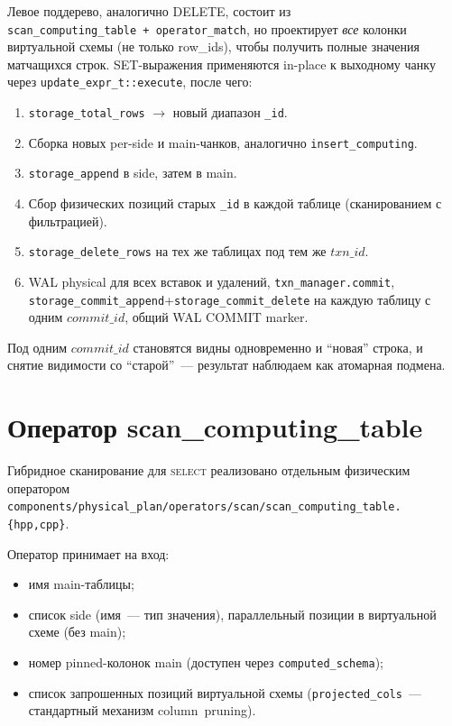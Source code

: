 Левое поддерево, аналогично DELETE, состоит из
\texttt{scan\_computing\_table~+~operator\_match}, но проектирует
\emph{все} колонки виртуальной схемы (не только row\_ids), чтобы
получить полные значения матчащихся строк. SET-выражения
применяются in-place к выходному чанку через
\texttt{update\_expr\_t::execute}, после чего:

\begin{enumerate}
    \item \texttt{storage\_total\_rows} $\to$ новый диапазон
    \texttt{\_id}.
    \item Сборка новых per-side и main-чанков, аналогично
    \texttt{insert\_computing}.
    \item \texttt{storage\_append} в side, затем в main.
    \item Сбор физических позиций старых \texttt{\_id} в каждой
    таблице (сканированием с фильтрацией).
    \item \texttt{storage\_delete\_rows} на тех же таблицах под
    тем же $\mathit{txn\_id}$.
    \item WAL physical для всех вставок и удалений,
    \texttt{txn\_manager.commit},
    \texttt{storage\_commit\_append}+\texttt{storage\_commit\_delete}
    на каждую таблицу с одним $\mathit{commit\_id}$, общий WAL
    COMMIT marker.
\end{enumerate}

Под одним $\mathit{commit\_id}$ становятся видны одновременно и
``новая'' строка, и снятие видимости со ``старой''~--- результат
наблюдаем как атомарная подмена.

\section{Оператор scan\_computing\_table}

Гибридное сканирование для \textsc{select} реализовано отдельным
физическим оператором
\texttt{components/physical\_plan/operators/scan/scan\_computing\_table.\{hpp,cpp\}}.

Оператор принимает на вход:
\begin{itemize}
    \item имя main-таблицы;
    \item список side (имя~--- тип значения), параллельный позиции
    в виртуальной схеме (без main);
    \item номер pinned-колонок main (доступен через
    \texttt{computed\_schema});
    \item список запрошенных позиций виртуальной схемы
    (\texttt{projected\_cols}~--- стандартный механизм
    column~pruning).
\end{itemize}

